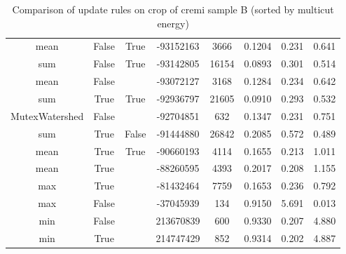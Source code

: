 \begin{table}
\begin{subtable}[t!]{0.98\textwidth}
\begin{tabular}{c| c | c| c | c | c | c | c}
mean & False & True & -93152163 & {\color{Orange} 3666 } & {\color{Orange} 0.1204 } & {\color{ForestGreen} 0.231 } & {\color{Red} 0.641 } \\
sum & False & True & -93142805 & {\color{Red} 16154 } & {\color{ForestGreen} 0.0893 } & {\color{Orange} 0.301 } & {\color{Orange} 0.514 } \\
mean & False &  & -93072127 & {\color{Orange} 3168 } & {\color{Orange} 0.1284 } & {\color{ForestGreen} 0.234 } & {\color{Red} 0.642 } \\
sum & True & True & -92936797 & {\color{Red} 21605 } & {\color{ForestGreen} 0.0910 } & {\color{ForestGreen} 0.293 } & {\color{Orange} 0.532 } \\
MutexWatershed & False &  & -92704851 & {\color{ForestGreen} 632 } & {\color{Orange} 0.1347 } & {\color{ForestGreen} 0.231 } & {\color{Red} 0.751 } \\
sum & True & False & -91444880 & {\color{Red} 26842 } & {\color{Red} 0.2085 } & {\color{Red} 0.572 } & {\color{Orange} 0.489 } \\
mean & True & True & -90660193 & {\color{Orange} 4114 } & {\color{Orange} 0.1655 } & {\color{ForestGreen} 0.213 } & {\color{Red} 1.011 } \\
mean & True &  & -88260595 & {\color{Orange} 4393 } & {\color{Red} 0.2017 } & {\color{ForestGreen} 0.208 } & {\color{Red} 1.155 } \\
max & True &  & -81432464 & {\color{Red} 7759 } & {\color{Orange} 0.1653 } & {\color{ForestGreen} 0.236 } & {\color{Red} 0.792 } \\
max & False &  & -37045939 & {\color{ForestGreen} 134 } & {\color{Red} 0.9150 } & {\color{Red} 5.691 } & {\color{ForestGreen} 0.013 } \\
min & False &  & 213670839 & {\color{ForestGreen} 600 } & {\color{Red} 0.9330 } & {\color{ForestGreen} 0.207 } & {\color{Red} 4.880 } \\
min & True &  & 214747429 & {\color{ForestGreen} 852 } & {\color{Red} 0.9314 } & {\color{ForestGreen} 0.202 } & {\color{Red} 4.887 } \\



        \end{tabular}
    \end{subtable} 
    \caption{Comparison of update rules on crop of cremi sample B (sorted by multicut energy)  }
    \label{tab:results_cremi_crop_C}
\end{table}

